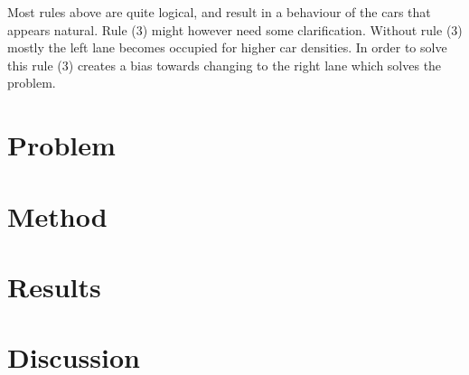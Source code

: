 \documentclass[a4paper,12pt]{article}
\begin{document}
Most rules above are quite logical, and result in a behaviour of the cars that appears natural. Rule (3) might however need some
clarification. Without rule (3) mostly the left lane becomes occupied for higher car densities. In order to solve this rule (3) creates
a bias towards changing to the right lane which solves the problem.


\section*{Problem}

\section*{Method}

\section*{Results}

\section*{Discussion}
\end{document}
